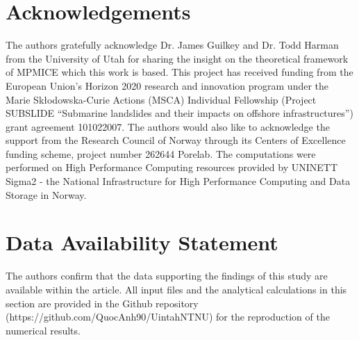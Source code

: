 \documentclass[preprint,12pt]{elsarticle}
\begin{document}
\section{\textsf{Acknowledgements}}
The authors gratefully acknowledge Dr. James Guilkey and Dr. Todd Harman from the University of Utah for sharing the insight on the theoretical framework of MPMICE which this work is based. This project has received funding from the European Union’s Horizon 2020 research and innovation program under the Marie Skłodowska-Curie Actions (MSCA) Individual Fellowship (Project SUBSLIDE “Submarine landslides and their impacts on offshore infrastructures”) grant agreement 101022007. The authors would also like to acknowledge the support from the Research Council of Norway through its Centers of Excellence funding scheme, project number 262644 Porelab. The computations were performed on High Performance Computing resources provided by UNINETT Sigma2 - the National Infrastructure for High Performance Computing and Data Storage in Norway.

\section{\textsf{Data Availability Statement}}
The authors confirm that the data supporting the findings of this study are available within the article. All input files and the analytical calculations in this section are provided in the Github repository\\
 (https://github.com/QuocAnh90/Uintah\textunderscore NTNU) for the reproduction of the numerical results.
\end{document}
